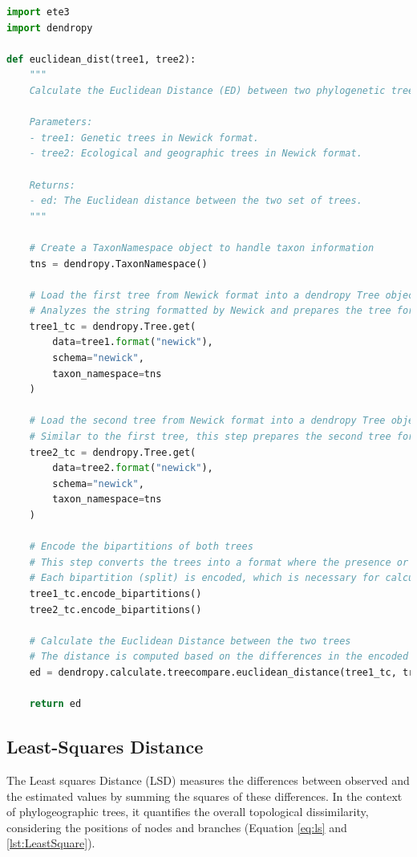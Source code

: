 \begin{lstlisting}[label=lst:euclideanDist,language=Python,caption=Python script for calculating the ED using the ete3 and the dendropy packages in the aPhyloGeo package]
import ete3
import dendropy

def euclidean_dist(tree1, tree2):
    """
    Calculate the Euclidean Distance (ED) between two phylogenetic trees.

    Parameters:
    - tree1: Genetic trees in Newick format.
    - tree2: Ecological and geographic trees in Newick format.

    Returns:
    - ed: The Euclidean distance between the two set of trees.
    """
    
    # Create a TaxonNamespace object to handle taxon information
    tns = dendropy.TaxonNamespace()

    # Load the first tree from Newick format into a dendropy Tree object
    # Analyzes the string formatted by Newick and prepares the tree for comparison.
    tree1_tc = dendropy.Tree.get(
        data=tree1.format("newick"), 
        schema="newick", 
        taxon_namespace=tns
    )
    
    # Load the second tree from Newick format into a dendropy Tree object
    # Similar to the first tree, this step prepares the second tree for comparison.
    tree2_tc = dendropy.Tree.get(
        data=tree2.format("newick"), 
        schema="newick", 
        taxon_namespace=tns
    )

    # Encode the bipartitions of both trees
    # This step converts the trees into a format where the presence or absence of 
    # Each bipartition (split) is encoded, which is necessary for calculating distances.
    tree1_tc.encode_bipartitions()
    tree2_tc.encode_bipartitions()

    # Calculate the Euclidean Distance between the two trees
    # The distance is computed based on the differences in the encoded bipartitions.
    ed = dendropy.calculate.treecompare.euclidean_distance(tree1_tc, tree2_tc)

    return ed
\end{lstlisting}

\subsection{Least-Squares Distance}\label{LS}

The Least squares Distance (LSD) measures the differences between observed and the estimated values by summing the squares of these differences. In the context of phylogeographic trees, it quantifies the overall topological dissimilarity, considering the positions of nodes and branches (Equation \eqref{eq:ls} and \autoref{lst:LeastSquare}).

